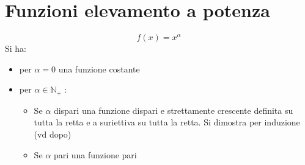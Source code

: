 \documentclass[10pt, oneside]{book}
\theoremstyle{plain}
\begin{document}
\section{Funzioni elevamento a potenza}
\[f(x) = x^\alpha\]
Si ha:
\begin{itemize}
\item per $\alpha = 0$ una funzione costante
\item per $\alpha \in \mathbb{N}_+$ :
\begin{itemize}
\item Se $\alpha$ dispari una funzione dispari e strettamente crescente definita su tutta la retta e a suriettiva su tutta la retta. Si dimostra per induzione (vd dopo)
\item Se $\alpha$ pari una funzione pari
\end{itemize}
\end{itemize}
\end{document}
